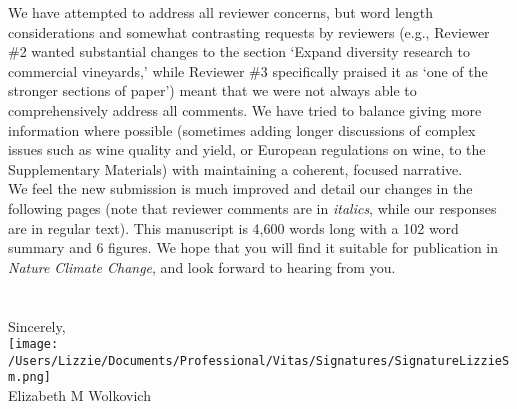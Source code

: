 \documentclass[11pt,a4paper]{letter}
\begin{document}
\begin{letter}{}
We have attempted to address all reviewer concerns, but word length considerations and somewhat contrasting requests by reviewers (e.g., Reviewer \#2 wanted substantial changes to the section `Expand diversity research to commercial vineyards,' while Reviewer \#3 specifically praised it as `one of the stronger sections of paper') meant that we were not always able to comprehensively address all comments. We have tried to balance giving more information where possible (sometimes adding longer discussions of complex issues such as wine quality and yield, or European regulations on wine, to the Supplementary Materials) with maintaining a coherent, focused narrative. 
\vspace{1.5ex}\\
We feel the new submission is much improved and detail our changes in the following pages (note that reviewer comments are in \emph{italics}, while our responses are in regular text). This manuscript is 4,600 words long with a 102 word summary and 6 figures. We hope that you will find it suitable for publication in \emph{Nature Climate Change}, and look forward to hearing from you.
\\
\\\vspace{-1ex}\\
\noindent Sincerely,\\

 \texttt{[image: /Users/Lizzie/Documents/Professional/Vitas/Signatures/SignatureLizzieSm.png]} \\

\noindent Elizabeth M Wolkovich

\end{letter}
\end{document}
